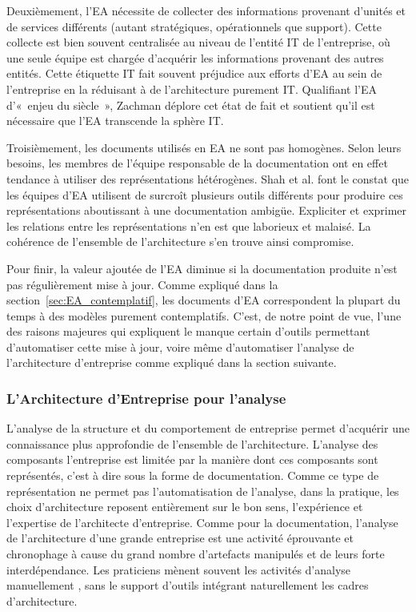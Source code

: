 Deuxièmement, l'EA nécessite de collecter des informations provenant
d'unités et de services différents (autant stratégiques, opérationnels que
support). Cette collecte est bien souvent centralisée au niveau de l'entité IT
de l'entreprise, où une seule équipe est chargée d'acquérir les informations
provenant des autres entités. Cette étiquette IT fait souvent préjudice aux
efforts d'EA au sein de l'entreprise en la réduisant à de l'architecture
purement IT. Qualifiant l'EA d'«~enjeu du siècle~», Zachman déplore cet état de
fait et soutient qu'il est nécessaire que l'EA transcende la sphère IT.


Troisièmement, les documents utilisés en EA ne sont pas homogènes. Selon
leurs besoins, les membres de l'équipe responsable de la documentation ont en
effet tendance à utiliser des représentations hétérogènes. Shah et al.
\cite{shah2007frameworks} font le constat que les équipes d'EA utilisent de
surcroît plusieurs outils différents pour produire ces représentations
aboutissant à une documentation ambigüe. Expliciter et exprimer les relations
entre les représentations n'en est que laborieux et malaisé. La cohérence de
l'ensemble de l'architecture s'en trouve ainsi compromise.

 Pour finir, la valeur ajoutée de l'EA diminue si la documentation produite
n'est pas régulièrement mise à jour. Comme expliqué dans la
section~\ref{sec:EA_contemplatif}, les documents d'EA correspondent la plupart
du temps à des modèles purement contemplatifs. C'est, de notre point de vue,
l'une des raisons majeures qui expliquent le manque certain d'outils permettant
d'automatiser cette mise à jour, voire même d'automatiser l'analyse de
l'architecture d'entreprise comme expliqué dans la section suivante.


        \subsubsection{L'Architecture d'Entreprise pour l'analyse}
    \label{sec:EA_analyse_limite}

L'analyse de la structure et du comportement de entreprise permet d'acquérir
une connaissance plus approfondie de l'ensemble de l'architecture. L'analyse des
composants l'entreprise est limitée par la manière dont ces composants sont
représentés, c'est à dire sous la forme de documentation. Comme ce type de
représentation ne permet pas l'automatisation de l'analyse, dans la pratique,
les choix d'architecture reposent entièrement sur le bon sens, l'expérience et
l'expertise de l'architecte d'entreprise. Comme pour la documentation, l'analyse
de l'architecture d'une grande entreprise est une activité éprouvante et
chronophage à cause du grand nombre d'artefacts manipulés et de leurs forte
interdépendance. Les praticiens mènent souvent les activités d'analyse
manuellement \cite{barn2013enterprise}, sans le support d'outils intégrant
naturellement les cadres d'architecture.

